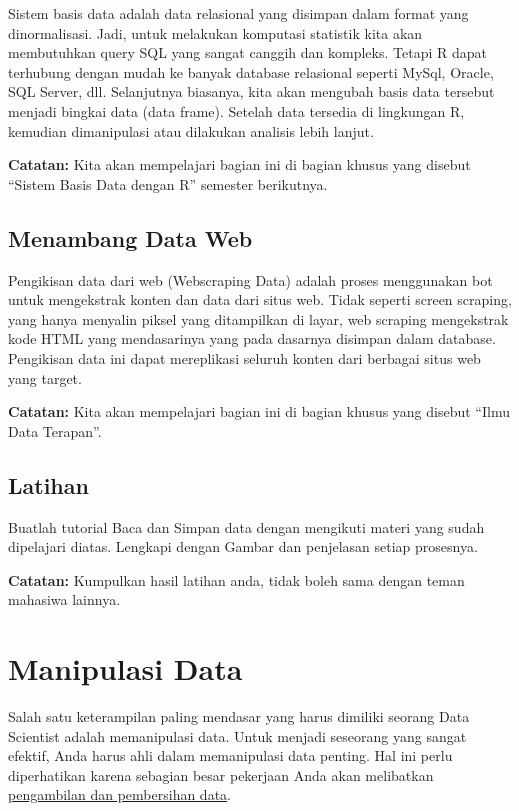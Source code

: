 \documentclass[
]{book}
\begin{document}
Sistem basis data adalah data relasional yang disimpan dalam format yang dinormalisasi. Jadi, untuk melakukan komputasi statistik kita akan membutuhkan query SQL yang sangat canggih dan kompleks. Tetapi R dapat terhubung dengan mudah ke banyak database relasional seperti MySql, Oracle, SQL Server, dll. Selanjutnya biasanya, kita akan mengubah basis data tersebut menjadi bingkai data (data frame). Setelah data tersedia di lingkungan R, kemudian dimanipulasi atau dilakukan analisis lebih lanjut.

\textbf{Catatan:} Kita akan mempelajari bagian ini di bagian khusus yang disebut ``Sistem Basis Data dengan R'' semester berikutnya.

\hypertarget{menambang-data-web}{%
\section{Menambang Data Web}\label{menambang-data-web}}

Pengikisan data dari web (Webscraping Data) adalah proses menggunakan bot untuk mengekstrak konten dan data dari situs web. Tidak seperti screen scraping, yang hanya menyalin piksel yang ditampilkan di layar, web scraping mengekstrak kode HTML yang mendasarinya yang pada dasarnya disimpan dalam database. Pengikisan data ini dapat mereplikasi seluruh konten dari berbagai situs web yang target.

\textbf{Catatan:} Kita akan mempelajari bagian ini di bagian khusus yang disebut ``Ilmu Data Terapan''.

\hypertarget{latihan-5}{%
\section{Latihan}\label{latihan-5}}

Buatlah tutorial Baca dan Simpan data dengan mengikuti materi yang sudah dipelajari diatas. Lengkapi dengan Gambar dan penjelasan setiap prosesnya.

\textbf{Catatan:} Kumpulkan hasil latihan anda, tidak boleh sama dengan teman mahasiwa lainnya.

\hypertarget{manipulasi-data}{%
\chapter{Manipulasi Data}\label{manipulasi-data}}

Salah satu keterampilan paling mendasar yang harus dimiliki seorang Data Scientist adalah memanipulasi data. Untuk menjadi seseorang yang sangat efektif, Anda harus ahli dalam memanipulasi data penting. Hal ini perlu diperhatikan karena sebagian besar pekerjaan Anda akan melibatkan \href{https://www.forbes.com/sites/gilpress/2016/03/23/data-preparation-most-time-consuming-least-enjoyable-data-science-task-survey-says/\#4b432fa66f63}{pengambilan dan pembersihan data}.
\end{document}
